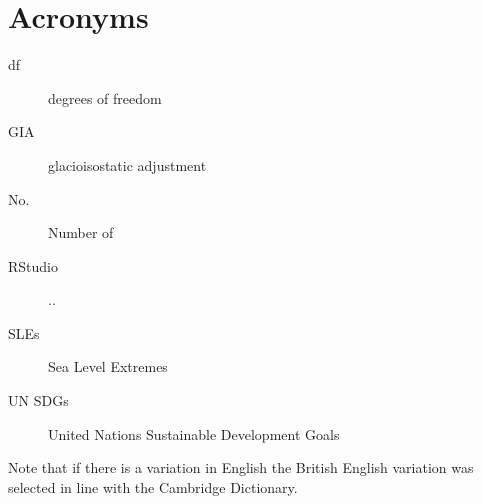 
\chapter{Acronyms}
\begin{description}
\item[df]degrees of freedom
\item[GIA] glacioisostatic adjustment
\item[No.] Number of
\item [RStudio] ..
\item[SLEs] Sea Level Extremes
\item [UN SDGs] United Nations Sustainable Development Goals 
\end{description}

Note that if there is a variation in English the British English variation was selected in line with the Cambridge Dictionary. 